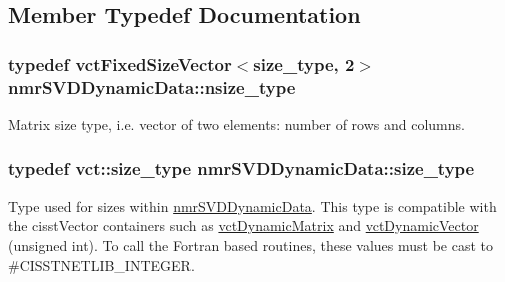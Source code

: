 \subsection{Member Typedef Documentation}
\hypertarget{classnmr_s_v_d_dynamic_data_a3673bb17448a97213388b41ce36ef5b0}{
\subsubsection[{nsize\-\_\-type}]{\setlength{\rightskip}{0pt plus 5cm}typedef {\bf vct\-Fixed\-Size\-Vector}$<${\bf size\-\_\-type}, 2$>$ {\bf nmr\-S\-V\-D\-Dynamic\-Data\-::nsize\-\_\-type}}}\label{classnmr_s_v_d_dynamic_data_a3673bb17448a97213388b41ce36ef5b0}
Matrix size type, i.\-e. vector of two elements\-: number of rows and columns. \hypertarget{classnmr_s_v_d_dynamic_data_ae1d183124f1fe39da05af9cea168101d}{
\subsubsection[{size\-\_\-type}]{\setlength{\rightskip}{0pt plus 5cm}typedef {\bf vct\-::size\-\_\-type} {\bf nmr\-S\-V\-D\-Dynamic\-Data\-::size\-\_\-type}}}\label{classnmr_s_v_d_dynamic_data_ae1d183124f1fe39da05af9cea168101d}
Type used for sizes within \hyperlink{classnmr_s_v_d_dynamic_data}{nmr\-S\-V\-D\-Dynamic\-Data}. This type is compatible with the cisst\-Vector containers such as \hyperlink{classvct_dynamic_matrix}{vct\-Dynamic\-Matrix} and \hyperlink{classvct_dynamic_vector}{vct\-Dynamic\-Vector} (unsigned int). To call the Fortran based routines, these values must be cast to \#\-C\-I\-S\-S\-T\-N\-E\-T\-L\-I\-B\-\_\-\-I\-N\-T\-E\-G\-E\-R. 

